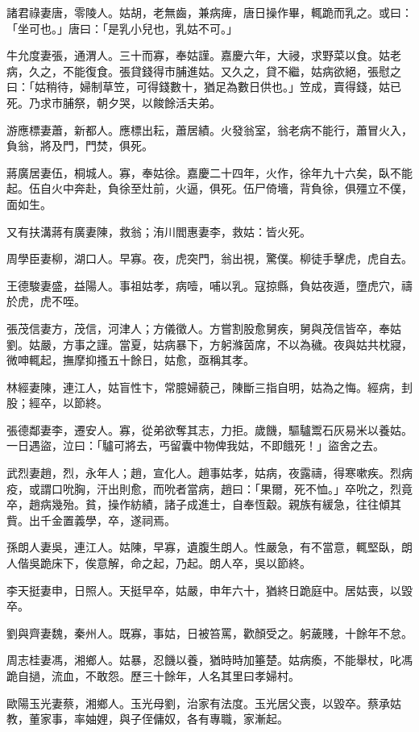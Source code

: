 \begin{pinyinscope}
諸君祿妻唐，零陵人。姑胡，老無齒，兼病痺，唐日操作畢，輒跪而乳之。或曰：「坐可也。」唐曰：「是乳小兒也，乳姑不可。」

牛允度妻張，通渭人。三十而寡，奉姑謹。嘉慶六年，大祲，求野菜以食。姑老病，久之，不能復食。張貸錢得市脯進姑。又久之，貸不繼，姑病欲絕，張慰之曰：「姑稍待，婦制草笠，可得錢數十，猶足為數日供也。」笠成，賣得錢，姑已死。乃求市脯祭，朝夕哭，以餕餘活夫弟。

游應標妻蕭，新都人。應標出耘，蕭居績。火發翁室，翁老病不能行，蕭冒火入，負翁，將及門，門焚，俱死。

蔣廣居妻伍，桐城人。寡，奉姑徐。嘉慶二十四年，火作，徐年九十六矣，臥不能起。伍自火中奔赴，負徐至灶前，火逼，俱死。伍尸倚墻，背負徐，俱殭立不僕，面如生。

又有扶溝蔣有廣妻陳，救翁；洧川閻惠妻李，救姑：皆火死。

周學臣妻柳，湖口人。早寡。夜，虎突門，翁出視，驚僕。柳徒手擊虎，虎自去。

王德駿妻盛，益陽人。事祖姑孝，病噎，哺以乳。寇掠縣，負姑夜遁，墮虎穴，禱於虎，虎不咥。

張茂信妻方，茂信，河津人；方儀徵人。方嘗割股愈舅疾，舅與茂信皆卒，奉姑劉。姑嚴，方事之謹。當夏，姑病暴下，方躬滌茵席，不以為穢。夜與姑共枕寢，微呻輒起，撫摩抑搔五十餘日，姑愈，亟稱其孝。

林經妻陳，連江人，姑盲性卞，常臆婦藐己，陳斷三指自明，姑為之悔。經病，刲股；經卒，以節終。

張德鄰妻李，遷安人。寡，從弟欲奪其志，力拒。歲饑，驅驢鬻石灰易米以養姑。一日遇盜，泣曰：「驢可將去，丐留囊中物俾我姑，不即餓死！」盜舍之去。

武烈妻趙，烈，永年人；趙，宣化人。趙事姑孝，姑病，夜露禱，得寒嗽疾。烈病疫，或謂口吮胸，汗出則愈，而吮者當病，趙曰：「果爾，死不恤。」卒吮之，烈竟卒，趙病幾殆。貧，操作紡績，諸子成進士，自奉恆觳。親族有緩急，往往傾其貲。出千金置義學，卒，遂祠焉。

孫朗人妻吳，連江人。姑陳，早寡，遺腹生朗人。性嚴急，有不當意，輒堅臥，朗人偕吳跪床下，俟意解，命之起，乃起。朗人卒，吳以節終。

李天挺妻申，日照人。天挺早卒，姑嚴，申年六十，猶終日跪庭中。居姑喪，以毀卒。

劉與齊妻魏，秦州人。既寡，事姑，日被笞罵，歡顏受之。躬薉賤，十餘年不怠。

周志桂妻馮，湘鄉人。姑暴，忍饑以養，猶時時加箠楚。姑病瘓，不能舉杖，叱馮跪自撾，流血，不敢怨。歷三十餘年，人名其里曰孝婦村。

歐陽玉光妻蔡，湘鄉人。玉光母劉，治家有法度。玉光居父喪，以毀卒。蔡承姑教，董家事，率妯娌，與子侄傭奴，各有專職，家漸起。


\end{pinyinscope}
